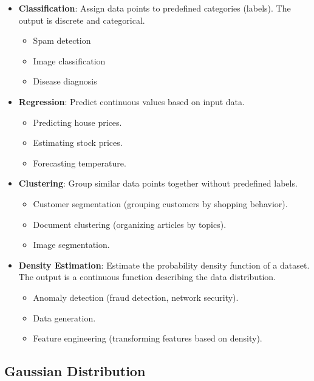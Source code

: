 \begin{itemize}
    \item {
        \textbf{Classification}: Assign data points to predefined categories (labels). The output is discrete and categorical.
        \begin{itemize}
            \item { Spam detection }
            \item { Image classification }
            \item { Disease diagnosis }
        \end{itemize}
    }
    \item {
        \textbf{Regression}: Predict continuous values based on input data.
        \begin{itemize}
            \item { Predicting house prices. }
            \item { Estimating stock prices. }
            \item { Forecasting temperature. }
        \end{itemize}
    }
    \item {
        \textbf{Clustering}: Group similar data points together without predefined labels.
        \begin{itemize}
            \item { Customer segmentation (grouping customers by shopping behavior). }
            \item { Document clustering (organizing articles by topics). }
            \item { Image segmentation. }
        \end{itemize}
    }
    \item {
        \textbf{Density Estimation}: Estimate the probability density function of a dataset. The output is a continuous function describing the data distribution.
        \begin{itemize}
            \item { Anomaly detection (fraud detection, network security). }
            \item { Data generation. }
            \item { Feature engineering (transforming features based on density). }
        \end{itemize}
    }
\end{itemize}

\subsection{Gaussian Distribution}\label{subsec:gaussian-distribution}

